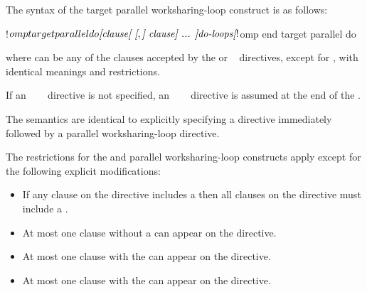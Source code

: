 \begin{fortranspecific}
The syntax of the target parallel worksharing-loop construct is as follows:

\begin{ompfPragma}
!$omp target parallel do \plc{[clause[ [},\plc{] clause] ... ]}
    \plc{do-loops}
\plc{[}!$omp end target parallel do\plc{]}
\end{ompfPragma}

where  can be any of the clauses accepted by the  or
~ directives, except for , with identical meanings and restrictions.

If an ~~~ directive is not specified, an
~~~ directive is assumed at the end of
the .
\end{fortranspecific}

\descr
The semantics are identical to explicitly specifying a  directive
immediately followed by a parallel worksharing-loop directive.


\restrictions
The restrictions for the  and parallel worksharing-loop constructs apply except for the following explicit modifications:

\begin{itemize}
\item If any  clause on the directive includes a
       then all  clauses
      on the directive must include a .

\item At most one  clause without a
       can appear on the directive.

\item At most one  clause with the 
       can appear on the directive.


\item At most one  clause with the 
       can appear on the directive.
\end{itemize}

